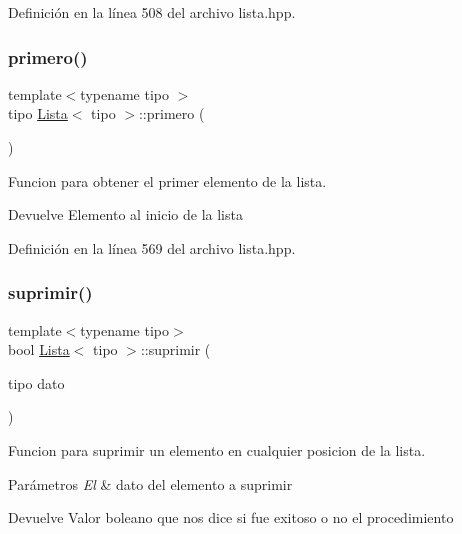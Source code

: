 Definición en la línea 508 del archivo lista.\+hpp.

\mbox{\label{classLista_a7bfb23a36d8476b8731d955bd52b81d5}} 
\subsubsection{\texorpdfstring{primero()}{primero()}}
{\footnotesize\ttfamily template$<$typename tipo $>$ \\
tipo \hyperlink{classLista}{Lista}$<$ tipo $>$\+::primero (\begin{DoxyParamCaption}{ }\end{DoxyParamCaption})}



Funcion para obtener el primer elemento de la lista. 

\begin{DoxyReturn}{Devuelve}
Elemento al inicio de la lista 
\end{DoxyReturn}


Definición en la línea 569 del archivo lista.\+hpp.

\mbox{\label{classLista_a846073e6ce175fa96c6322a4870ddc6d}} 
\subsubsection{\texorpdfstring{suprimir()}{suprimir()}}
{\footnotesize\ttfamily template$<$typename tipo$>$ \\
bool \hyperlink{classLista}{Lista}$<$ tipo $>$\+::suprimir (\begin{DoxyParamCaption}\item[{tipo}]{dato }\end{DoxyParamCaption})}



Funcion para suprimir un elemento en cualquier posicion de la lista. 


\begin{DoxyParams}{Parámetros}
{\em El} & dato del elemento a suprimir \\
\hline
\end{DoxyParams}
\begin{DoxyReturn}{Devuelve}
Valor boleano que nos dice si fue exitoso o no el procedimiento 
\end{DoxyReturn}


